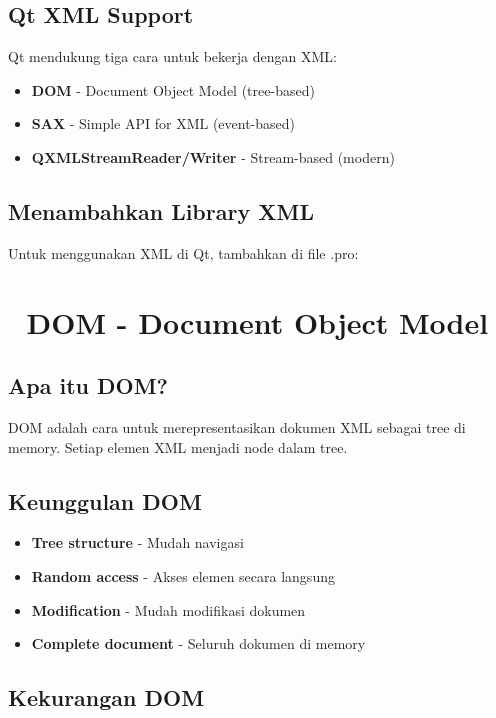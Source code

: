 \subsection{Qt XML Support}

Qt mendukung tiga cara untuk bekerja dengan XML:

\begin{itemize}
\item \textbf{DOM} - Document Object Model (tree-based)
\item \textbf{SAX} - Simple API for XML (event-based)
\item \textbf{QXMLStreamReader/Writer} - Stream-based (modern)
\end{itemize}

\subsection{Menambahkan Library XML}

Untuk menggunakan XML di Qt, tambahkan di file .pro:



\section{🌳 DOM - Document Object Model}

\subsection{Apa itu DOM?}

DOM adalah cara untuk merepresentasikan dokumen XML sebagai tree di memory. Setiap elemen XML menjadi node dalam tree.

\subsection{Keunggulan DOM}

\begin{itemize}
\item \textbf{Tree structure} - Mudah navigasi
\item \textbf{Random access} - Akses elemen secara langsung
\item \textbf{Modification} - Mudah modifikasi dokumen
\item \textbf{Complete document} - Seluruh dokumen di memory
\end{itemize}

\subsection{Kekurangan DOM}

